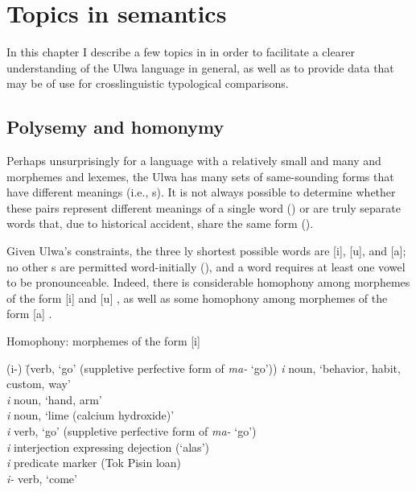 \chapter{Topics in semantics}\label{sec:14}


In this chapter I describe a few topics in  in order to facilitate a clearer understanding of the Ulwa language in general, as well as to provide data that may be of use for crosslinguistic typological comparisons.


\section{Polysemy and homonymy}\label{sec:14.1}


Perhaps unsurprisingly for a language with a relatively small  and many  and  morphemes and lexemes, the Ulwa  has many sets of same-sounding forms that have different meanings (i.e., s). It is not always possible to determine whether these pairs represent different meanings of a single word () or are truly separate words that, due to historical accident, share the same  form ().

  Given Ulwa’s  constraints, the three ly shortest possible words are [i], [u], and [a]; no other s are permitted word-initially (), and a word requires at least one vowel to be pronounceable. Indeed, there is considerable homophony among morphemes of the form [i]  and [u] , as well as some homophony among morphemes of the form [a] .
  
\ea%
    \label{ex:sem:1a}
            Homophony: morphemes of the form [i]
\begin{tabbing}
    {(i-)} \= {(verb, ‘go’ (suppletive perfective form of \textit{ma-} ‘go’))}\kill
{\textit{i}} \> {noun, ‘behavior, habit, custom, way’}\\
{\textit{i}} \> {noun, ‘hand, arm’}\\
{\textit{i}} \> {noun, ‘lime (calcium hydroxide)’}\\
{\textit{i}} \> {verb, ‘go’ (suppletive perfective form of \textit{ma-} ‘go’)}\\
{\textit{i}} \> {interjection expressing dejection (‘alas’)}\\
{\textit{i}} \> {predicate marker (Tok Pisin loan)}\\
{\textit{i-}} \> {verb, ‘come’}
\end{tabbing}
\z

